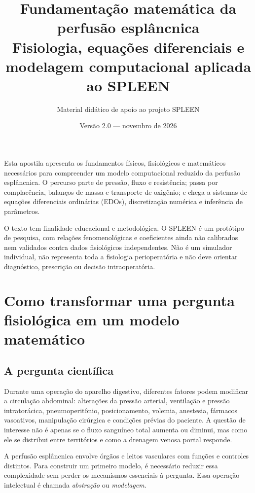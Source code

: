 \documentclass[11pt,a4paper,oneside]{book}
\title{\Huge\bfseries Fundamentação matemática da perfusão esplâncnica\\[0.4em]
\Large Fisiologia, equações diferenciais e modelagem computacional aplicada ao SPLEEN}
\author{Material didático de apoio ao projeto SPLEEN}
\date{Versão 2.0 — novembro de 2026}
\begin{document}
\frontmatter
\maketitle

\begin{tcolorbox}[colback=blue!3,colframe=blue!45!black,title=Propósito e escopo]
Esta apostila apresenta os fundamentos físicos, fisiológicos e matemáticos necessários para compreender um modelo computacional reduzido da perfusão esplâncnica. O percurso parte de pressão, fluxo e resistência; passa por complacência, balanços de massa e transporte de oxigênio; e chega a sistemas de equações diferenciais ordinárias (EDOs), discretização numérica e inferência de parâmetros.

O texto tem finalidade educacional e metodológica. O SPLEEN é um protótipo de pesquisa, com relações fenomenológicas e coeficientes ainda não calibrados nem validados contra dados fisiológicos independentes. Não é um simulador individual, não representa toda a fisiologia perioperatória e não deve orientar diagnóstico, prescrição ou decisão intraoperatória.
\end{tcolorbox}

\tableofcontents

\mainmatter

\chapter{Como transformar uma pergunta fisiológica em um modelo matemático}

\section{A pergunta científica}
Durante uma operação do aparelho digestivo, diferentes fatores podem modificar a circulação abdominal: alterações da pressão arterial, ventilação e pressão intratorácica, pneumoperitônio, posicionamento, volemia, anestesia, fármacos vasoativos, manipulação cirúrgica e condições prévias do paciente. A questão de interesse não é apenas se o fluxo sanguíneo total aumenta ou diminui, mas como ele se distribui entre territórios e como a drenagem venosa portal responde.

A perfusão esplâncnica envolve órgãos e leitos vasculares com funções e controles distintos. Para construir um primeiro modelo, é necessário reduzir essa complexidade sem perder os mecanismos essenciais à pergunta. Essa operação intelectual é chamada \textit{abstração} ou \textit{modelagem}.
\end{document}

